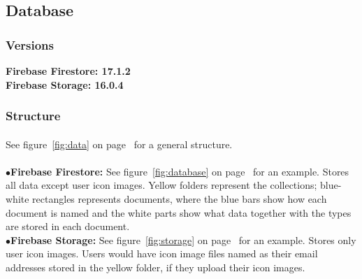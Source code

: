 \documentclass[12pt]{article}
\begin{document}
\subsection{Database}
\subsubsection{Versions}
\hspace{12pt}\textbf{Firebase Firestore: 17.1.2} \\
\null\hspace{12pt}\textbf{Firebase Storage: 16.0.4}
\subsubsection{Structure}
\paragraph{}
See figure~\ref{fig:data} on page~\pageref{fig:data} for a general structure. \\ \\
\null\hspace{12pt}$\bullet$\enskip\textbf{Firebase Firestore:} See figure~\ref{fig:database} on page~\pageref{fig:database} for an example. Stores all data except user icon images. Yellow folders represent the collections; blue-white rectangles represents documents, where the blue bars show how each document is named and the white parts show what data together with the types are stored in each document. \\
\null\hspace{12pt}$\bullet$\enskip\textbf{Firebase Storage:} See figure~\ref{fig:storage} on page~\pageref{fig:storage} for an example. Stores only user icon images. Users would have icon image files named as their email addresses stored in the yellow folder, if they upload their icon images.
\end{document}
